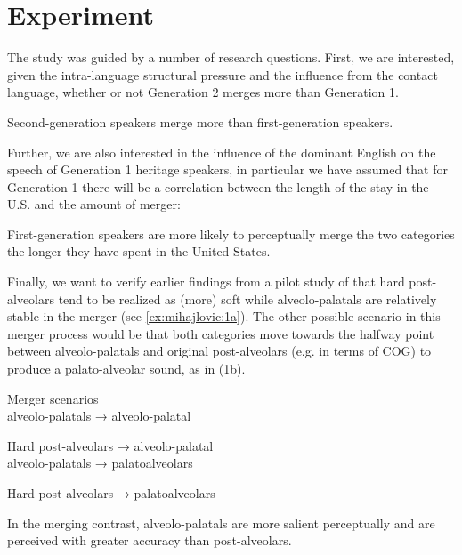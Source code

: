 \documentclass[output=paper,modfonts,nonflat,
]{langsci/langscibook}
\begin{document}
\section{Experiment}\label{sec:mihajlovic:4}

The study was guided by a number of research questions. First, we are interested, given the intra-language structural pressure and the influence from the contact language, whether or not Generation 2 merges more than Generation 1.


\begin{exe}
  Second-generation speakers merge more than first-generation   speakers.
\end{exe}


Further, we are also interested in the influence of the dominant English on the speech of Generation 1 heritage speakers, in particular we have assumed that for Generation 1 there will be a correlation between the length of the stay in the U.S. and the amount of merger:


\begin{exe}
  First-generation speakers are more likely to perceptually merge   the two categories the longer they have spent in the United   States.
\end{exe}


Finally, we want to verify earlier findings from a pilot study of \citet{Ćavaretal2016} that hard post-alveolars tend to be realized as (more) soft while alveolo-palatals are relatively stable in the merger (see \ref{ex:mihajlovic:1a}). The other possible scenario in this merger process would be that both categories move towards the halfway point between alveolo-palatals and original post-alveolars (e.g. in terms of COG) to produce a palato-alveolar sound, as in (1b).

\ea

   Merger scenarios\\
   \ea\label{ex:mihajlovic:1a}
{   alveolo-palatals      → alveolo-palatal}

        Hard post-alveolars → alveolo-palatal\\
{\ex  alveolo-palatals       → palatoalveolars}

        Hard post-alveolars → palatoalveolars\\

\z
\z

\begin{exe}
  In the merging contrast, alveolo-palatals are more salient perceptually and are perceived with greater accuracy than post-alveolars.
\end{exe}
\end{document}
